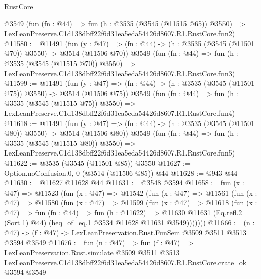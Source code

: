 \begin{lexlean}{RustCore}
\begin{coremodule}
    @3549
    (fun (fn : @44) =>
    fun (h : @3535 (@3545 (@11515 @65)) @3550) =>
    LexLeanPreserve.C1d138dbff22f6d31ea5eda54426d8607.R1.RustCore.fun2)
@11580 := @11491
    (fun (y : @47) => (fn : @44) -> (h : @3535 (@3545 (@11501 @70)) @3550) -> @3514 (@11506 @70))
    @3549
    (fun (fn : @44) =>
    fun (h : @3535 (@3545 (@11515 @70)) @3550) =>
    LexLeanPreserve.C1d138dbff22f6d31ea5eda54426d8607.R1.RustCore.fun3)
@11599 := @11491
    (fun (y : @47) => (fn : @44) -> (h : @3535 (@3545 (@11501 @75)) @3550) -> @3514 (@11506 @75))
    @3549
    (fun (fn : @44) =>
    fun (h : @3535 (@3545 (@11515 @75)) @3550) =>
    LexLeanPreserve.C1d138dbff22f6d31ea5eda54426d8607.R1.RustCore.fun4)
@11618 := @11491
    (fun (y : @47) => (fn : @44) -> (h : @3535 (@3545 (@11501 @80)) @3550) -> @3514 (@11506 @80))
    @3549
    (fun (fn : @44) =>
    fun (h : @3535 (@3545 (@11515 @80)) @3550) =>
    LexLeanPreserve.C1d138dbff22f6d31ea5eda54426d8607.R1.RustCore.fun5)
@11622 := @3535 (@3545 (@11501 @85)) @3550
@11627 := Option.noConfusion.{0, 0} (@3514 (@11506 @85)) @44
@11628 := @943 @44
@11630 := @11627 @11628 @44
@11631 := @3548 @3594
@11658 := fun (x : @47) =>
  @11523
    (fun (x : @47) =>
    @11542
      (fun (x : @47) =>
      @11561
        (fun (x : @47) =>
        @11580
          (fun (x : @47) =>
          @11599
            (fun (x : @47) =>
            @11618
              (fun (x : @47) =>
              fun (fn : @44) =>
              fun (h : @11622) =>
              @11630
                @11631
                (Eq.refl.{2} (Sort 1) @44)
                (heq_of_eq.{1} @3534 @11628 @11631 @3549)))))))
@11666 := (n : @47) -> (f : @47) -> LexLeanPreservation.Rust.FunSem @3509 @3511 @3513 @3594 @3549
@11676 := fun (n : @47) =>
  fun (f : @47) =>
  LexLeanPreservation.Rust.simulate
    @3509
    @3511
    @3513
    LexLeanPreserve.C1d138dbff22f6d31ea5eda54426d8607.R1.RustCore.crate_ok
    @3594
    @3549
\end{coremodule}
\end{lexlean}
